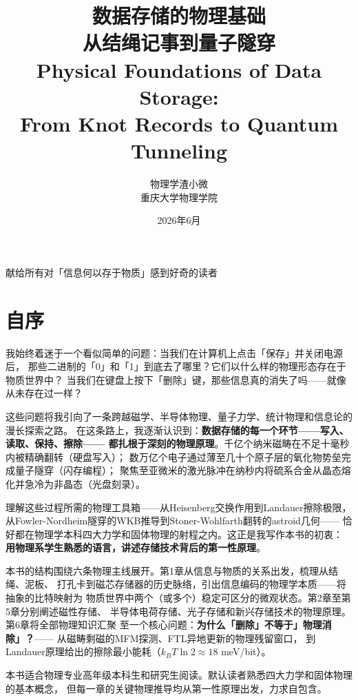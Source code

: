 \documentclass[11pt,a4paper,openany]{book}
\title{{\Huge\bfseries 数据存储的物理基础}\\[12pt]
       {\Large 从结绳记事到量子隧穿}\\[20pt]
       {\normalsize Physical Foundations of Data Storage:\\
        From Knot Records to Quantum Tunneling}}
\author{{\large 物理学渣小微}\\[4pt]
        {\normalsize 重庆大学物理学院}}
\date{2026年6月}
\theoremstyle{definition}
\theoremstyle{plain}
\theoremstyle{remark}
\begin{document}
\maketitle
\thispagestyle{empty}

\vspace*{6cm}
\begin{center}
{\small 献给所有对「信息何以存于物质」感到好奇的读者}
\end{center}
\newpage

\chapter*{自序}

我始终着迷于一个看似简单的问题：当我们在计算机上点击「保存」并关闭电源后，
那些二进制的「0」和「1」到底去了哪里？它们以什么样的物理形态存在于物质世界中？
当我们在键盘上按下「删除」键，那些信息真的消失了吗——就像从未存在过一样？

这些问题将我引向了一条跨越磁学、半导体物理、量子力学、统计物理和信息论的漫长探索之路。
在这条路上，我逐渐认识到：\textbf{数据存储的每一个环节——写入、读取、保持、擦除——
都扎根于深刻的物理原理}。千亿个纳米磁畴在不足十毫秒内被精确翻转（硬盘写入）；
数万亿个电子通过薄至几十个原子层的氧化物势垒完成量子隧穿（闪存编程）；
聚焦至亚微米的激光脉冲在纳秒内将硫系合金从晶态熔化并急冷为非晶态（光盘刻录）。

理解这些过程所需的物理工具箱——从Heisenberg交换作用到Landauer擦除极限，
从Fowler-Nordheim隧穿的WKB推导到Stoner-Wohlfarth翻转的astroid几何——
恰好都在物理学本科四大力学和固体物理的射程之内。这正是我写作本书的初衷：
\textbf{用物理系学生熟悉的语言，讲述存储技术背后的第一性原理}。

本书的结构围绕六条物理主线展开。第1章从信息与物质的关系出发，梳理从结绳、泥板、
打孔卡到磁芯存储器的历史脉络，引出信息编码的物理学本质——将抽象的比特映射为
物质世界中两个（或多个）稳定可区分的微观状态。第2章至第5章分别阐述磁性存储、
半导体电荷存储、光子存储和新兴存储技术的物理原理。第6章将全部物理知识汇聚
至一个核心问题：\textbf{为什么「删除」不等于」物理消除」？}——
从磁畴剩磁的MFM探测、FTL异地更新的物理残留窗口，
到Landauer原理给出的擦除最小能耗（$k_B T\ln 2 \approx 18$ meV/bit）。

本书适合物理专业高年级本科生和研究生阅读。默认读者熟悉四大力学和固体物理的基本概念，
但每一章的关键物理推导均从第一性原理出发，力求自包含。
\end{document}
